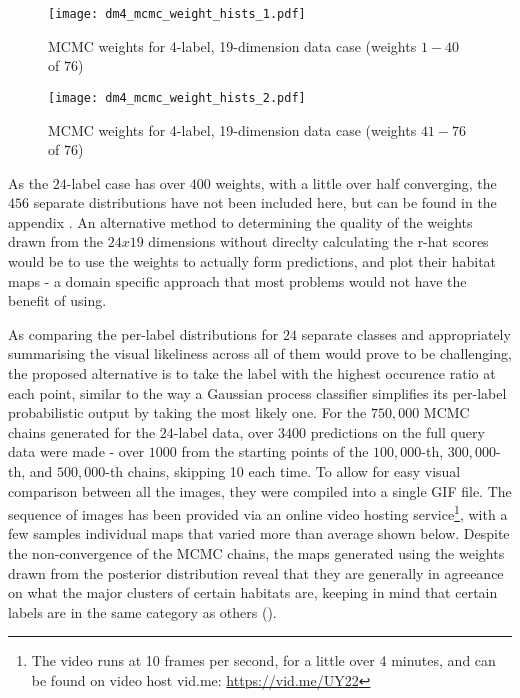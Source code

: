 
\begin{figure}[H]
    \centerline{\texttt{[image: dm4\_mcmc\_weight\_hists\_1.pdf]}}
    \caption{MCMC weights for 4-label, 19-dimension data case (weights $1-40$ of $76$)}
    \label{fig:4l-mcmc_weights-1}
\end{figure}


\begin{figure}[H]
    \centerline{\texttt{[image: dm4\_mcmc\_weight\_hists\_2.pdf]}}
    \caption{MCMC weights for 4-label, 19-dimension data case (weights $41-76$ of $76$)}
    \label{fig:4l-mcmc_weights-2}
\end{figure}

As the $24$-label case has over $400$ weights, with a little over half converging, the $456$ separate distributions have not been included here, but can be found in the appendix . An alternative method to determining the quality of the weights drawn from the $24x19$ dimensions without direclty calculating the r-hat scores would be to use the weights to actually form predictions, and plot their habitat maps - a domain specific approach that most problems would not have the benefit of using. 

As comparing the per-label distributions for $24$ separate classes and appropriately summarising the visual likeliness across all of them would prove to be challenging, the proposed alternative is to take the label with the highest occurence ratio at each point, similar to the way a Gaussian process classifier simplifies its per-label probabilistic output by taking the most likely one. For the $750,000$ MCMC chains generated for the $24$-label data, over $3400$ predictions on the full query data were made - over $1000$ from the starting points of the $100,000$-th, $300,000$-th, and $500,000$-th chains, skipping 10 each time. To allow for easy visual comparison between all the images, they were compiled into a single GIF file. The sequence of images has been provided via an online video hosting service\footnote{The video runs at 10 frames per second, for a little over 4 minutes, and can be found on video host vid.me: \url{https://vid.me/UY22}}, with a few samples individual maps that varied more than average shown below. Despite the non-convergence of the MCMC chains, the maps generated using the weights drawn from the posterior distribution reveal that they are generally in agreeance on what the major clusters of certain habitats are, keeping in mind that certain labels are in the same category as others ().

